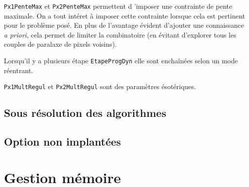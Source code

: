 {\tt Px1PenteMax} et {\tt Px2PenteMax} permettent d 'imposer une contrainte 
de pente maximale. On a tout int\'eret \`a imposer cette contrainte lorsque
cela est pertinent pour le probl\`eme pos\'e. En plus de l'avantage 
\'evident d'ajouter une connaissance \emph{a priori}, cela permet 
de limiter la combinatoire (en \'evitant d'explorer tous les couples 
de paralaxe de pixels voisins).

Lorsqu'il y a plusieurs \'etape {\tt EtapeProgDyn} elle sont
encha\^in\'ees selon un mode r\'eentrant.


{\tt Px1MultRegul} et {\tt Px2MultRegul} sont des param\`etres \'esot\'eriques.



\subsection{Sous r\'esolution des algorithmes}

\subsection{Option non implant\'ees}



\section{Gestion m\'emoire}


